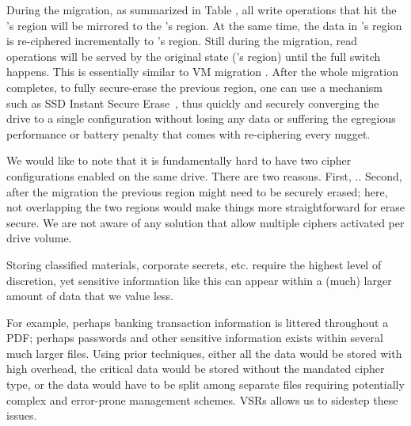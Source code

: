 During the migration, as summarized in Table , all write
operations that hit the \cone's region will be mirrored to the \ctwo's region.
At the same time, the data in \cone's region is re-ciphered incrementally to
\ctwo's region. Still during the migration, read operations will be served by
the original state (\cone's region) until the full switch happens. This is
essentially similar to VM migration \cite{google-live-vm-migration-nsdi}. After
the whole migration completes, to fully secure-erase the previous region, one
can use a mechanism such as SSD Instant Secure Erase~\cite{ISE1,ISE2,ISE3}, thus
quickly and securely converging the drive to a single configuration without
losing any data or suffering the egregious performance or battery penalty that
comes with re-ciphering every nugget.

We would like to note that it is fundamentally hard to have two cipher
configurations enabled on the same drive. There are two reasons. First,
.. Second, after the migration the
previous region might need to be securely erased; here, not overlapping the two
regions would make things more straightforward for erase secure. We are not
aware of any solution that allow multiple ciphers activated per drive volume.



 Storing classified materials, corporate secrets,
etc. require the highest level of discretion, yet sensitive information like
this can appear within a (much) larger amount of data that we value less.

For example, perhaps banking transaction information is littered throughout a
PDF; perhaps passwords and other sensitive information exists within several
much larger files. Using prior techniques, either all the data would be stored
with high overhead, the critical data would be stored without the mandated
cipher type, or the data would have to be split among separate files requiring
potentially complex and error-prone management schemes. \sys VSRs allows us to
sidestep these issues.


